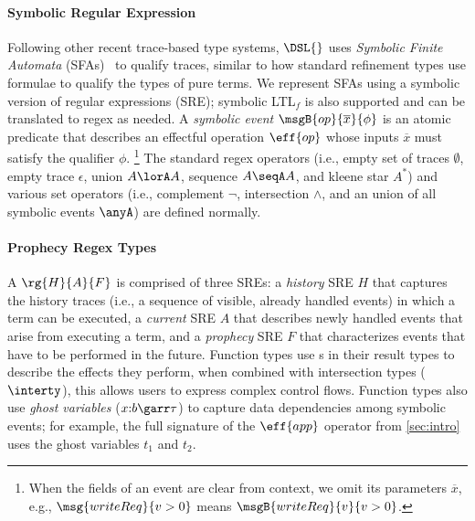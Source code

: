 \paragraph{Symbolic Regular Expression} Following other recent
trace-based type systems\cite{ZYDJ24}, $\DSL{}$ uses \emph{Symbolic
  Finite Automata} (SFAs)~\cite{Vea13,SFA-minimization,
  SFA-Transducers} to qualify traces, similar to how standard
refinement types use formulae to qualify the types of pure terms.
We represent SFAs using a symbolic version of regular expressions (SRE); symbolic LTL$_f$ is also supported and can be translated to regex as needed.
A \emph{symbolic event} $\msgB{op}{\overline{x}}{\phi}$ is an atomic predicate that
describes an effectful operation {$\eff{op}$} whose inputs
$\overline{x}$ must satisfy the qualifier $\phi$.
\footnote{When the
  fields of an event are clear from context, we omit its parameters
  $\overline{x}$, e.g., $\msg{writeReq}{v > 0}$ means
  $\msgB{writeReq}{v}{v > 0}$.}
  The standard regex operators (i.e., empty set of traces $\emptyset$, empty trace $\epsilon$, union $A \lorA A$, sequence $A \seqA A$, and kleene star $A^*$) and various set operators (i.e., complement $\neg$, intersection $\land$, and an union of all symbolic events $\anyA$) are defined normally.




\paragraph{Prophecy Regex Types} A \PAT{} $\rg{H}{A}{F}$ is
comprised of three SREs: a \emph{history} SRE $H$ that captures the
history traces (i.e., a sequence of visible, already handled events) in which a term can be executed, a \emph{current} SRE $A$ that
describes newly handled  events that arise from executing a term, and
a \emph{prophecy} SRE $F$ that characterizes events that have to be performed in the future.
Function types use \PAT{}s in their result types
to describe the effects they perform, when combined with intersection
types ($\interty$), this allows users to express complex control
flows. Function types also use \emph{ghost variables}
($x{:}b \garr \tau$) to capture data dependencies among
symbolic events; for example, the full signature of the $\eff{app}$
operator from \autoref{sec:intro} uses the ghost variables $t_1$ and $t_2$.

